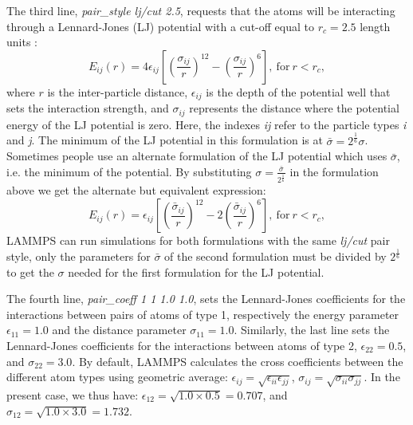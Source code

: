\documentclass[9pt,tutorial]{livecoms}
\begin{document}
The third line, \textit{pair\_style lj/cut 2.5}, requests that the atoms will
be interacting through a Lennard-Jones (LJ) potential with a cut-off equal to
$r_c = 2.5$ length units \cite{wang2020lennard,fischer2023history}:
$$E_{ij} (r) = 4 \epsilon_{ij} \left[ \left( \dfrac{\sigma_{ij}}{r} \right)^{12}
  - \left( \dfrac{\sigma_{ij}}{r} \right)^{6} \right], ~ \text{for} ~ r
< r_c,$$ where $r$ is the inter-particle distance, $\epsilon_{ij}$ is
the depth of the potential well that sets the interaction strength, and
$\sigma_{ij}$ represents the distance where the potential energy of the
LJ potential is zero.  Here, the indexes \textit{ij} refer to the
particle types \textit{i} and \textit{j}.  The minimum of the LJ
potential in this formulation is at
$\bar{\sigma} = 2^{\frac{1}{6}}\sigma$.  Sometimes people use an
alternate formulation of the LJ potential which uses $\bar{\sigma}$,
i.e. the minimum of the potential.  By substituting
$\sigma = \frac{\bar{\sigma}}{2^{\frac{1}{6}}}$ in the formulation above
we get the alternate but equivalent expression:
$$E_{ij} (r) = \epsilon_{ij} \left[ \left( \dfrac{\bar{\sigma}_{ij}}{r} \right)^{12}
  - 2\left( \dfrac{\bar{\sigma}_{ij}}{r} \right)^{6} \right], ~
\text{for} ~ r < r_c,$$ LAMMPS can run simulations for both formulations
with the same \textit{lj/cut} pair style, only the parameters for $\bar{\sigma}$
of the second formulation must be divided by $2^{\frac{1}{6}}$ to get the $\sigma$
needed for the first formulation for the LJ potential.

The fourth line, \textit{pair\_coeff 1 1 1.0 1.0}, sets the
Lennard-Jones coefficients for the interactions between pairs of atoms
of type 1, respectively the energy parameter $\epsilon_{11} = 1.0$ and
the distance parameter $\sigma_{11} = 1.0$.  Similarly, the last line
sets the Lennard-Jones coefficients for the interactions between atoms
of type 2, $\epsilon_{22} = 0.5$, and $\sigma_{22} = 3.0$.  By default,
LAMMPS calculates the cross coefficients between the different atom
types using geometric average:
$\epsilon_{ij} = \sqrt{\epsilon_{ii} \epsilon_{jj}}$,
$\sigma_{ij} = \sqrt{\sigma_{ii} \sigma_{jj}}$.  In the present case, we
thus have: $\epsilon_{12} = \sqrt{1.0 \times 0.5} = 0.707$, and
$\sigma_{12} = \sqrt{1.0 \times 3.0} = 1.732$.
\end{document}
